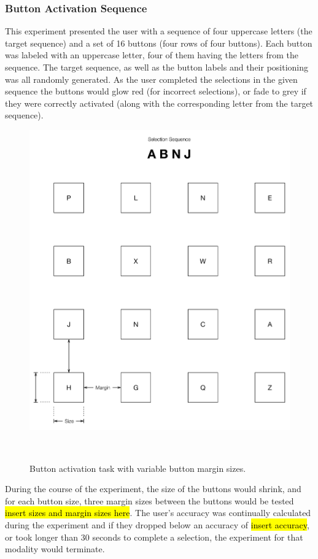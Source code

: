 \documentclass{sigchi}
\begin{document}
\subsubsection{Button Activation Sequence}
This experiment presented the user with a sequence of four uppercase letters (the target sequence) and a set of 16 buttons (four rows of four buttons). Each button was labeled with an uppercase letter, four of them having the letters from the sequence. The target sequence, as well as the button labels and their positioning was all randomly generated. As the user completed the selections in the given sequence the buttons would glow red (for incorrect selections), or fade to grey if they were correctly activated (along with the corresponding letter from the target sequence). 

\begin{figure}
\centering
  \includegraphics[width=0.9\columnwidth]{figures/sui.pdf}
  \caption{Button activation task with variable button margin sizes.
  }~\label{fig:sui}
\end{figure}

During the course of the experiment, the size of the buttons would shrink, and for each button size, three margin sizes between the buttons would be tested \hl{insert sizes and margin sizes here}. The user's accuracy was continually calculated during the experiment and if they dropped below an accuracy of \hl{insert accuracy}, or took longer than 30 seconds to complete a selection, the experiment for that modality would terminate.
\end{document}
